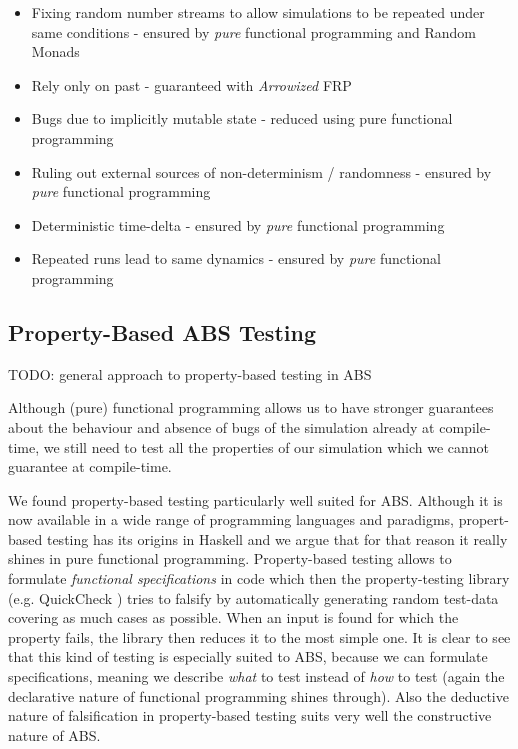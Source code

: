 \begin{itemize}
	\item Fixing random number streams to allow simulations to be repeated under same conditions - ensured by \textit{pure} functional programming and Random Monads
	\item Rely only on past - guaranteed with \textit{Arrowized} FRP
	\item Bugs due to implicitly mutable state - reduced using pure functional programming
	\item Ruling out external sources of non-determinism / randomness - ensured by \textit{pure} functional programming
	\item Deterministic time-delta - ensured by \textit{pure} functional programming
	\item Repeated runs lead to same dynamics - ensured by \textit{pure} functional programming
\end{itemize}

\subsection{Property-Based ABS Testing}
TODO: general approach to property-based testing in ABS

Although (pure) functional programming allows us to have stronger guarantees about the behaviour and absence of bugs of the simulation already at compile-time, we still need to test all the properties of our simulation which we cannot guarantee at compile-time.

We found property-based testing particularly well suited for ABS. Although it is now available in a wide range of programming languages and paradigms, propert-based testing has its origins in Haskell \cite{claessen_quickcheck:_2000, claessen_testing_2002} and we argue that for that reason it really shines in pure functional programming. Property-based testing allows to formulate \textit{functional specifications} in code which then the property-testing library (e.g. QuickCheck \cite{claessen_quickcheck:_2000}) tries to falsify by automatically generating random test-data covering as much cases as possible. When an input is found for which the property fails, the library then reduces it to the most simple one. It is clear to see that this kind of testing is especially suited to ABS, because we can formulate specifications, meaning we describe \textit{what} to test instead of \textit{how} to test (again the declarative nature of functional programming shines through). Also the deductive nature of falsification in property-based testing suits very well the constructive nature of ABS.


